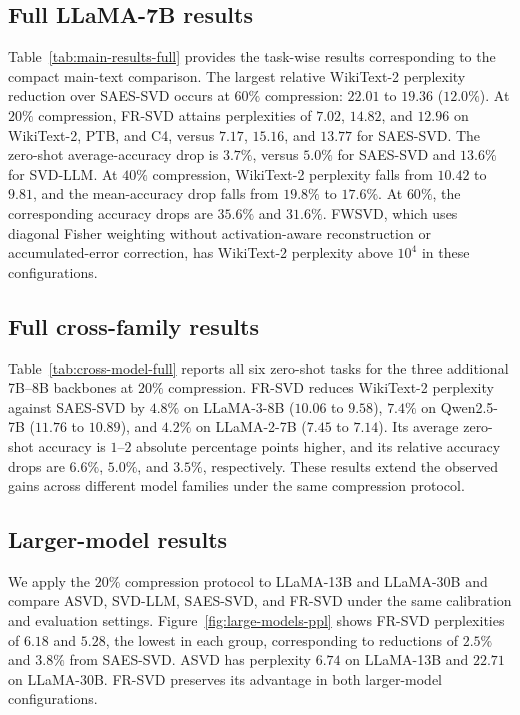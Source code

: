 \subsection{Full LLaMA-7B results}
Table~\ref{tab:main-results-full} provides the task-wise results corresponding to the compact main-text comparison. The largest relative WikiText-2 perplexity reduction over SAES-SVD occurs at $60\%$ compression: $22.01$ to $19.36$ ($12.0\%$). At $20\%$ compression, FR-SVD attains perplexities of $7.02$, $14.82$, and $12.96$ on WikiText-2, PTB, and C4, versus $7.17$, $15.16$, and $13.77$ for SAES-SVD. The zero-shot average-accuracy drop is $3.7\%$, versus $5.0\%$ for SAES-SVD and $13.6\%$ for SVD-LLM. At $40\%$ compression, WikiText-2 perplexity falls from $10.42$ to $9.81$, and the mean-accuracy drop falls from $19.8\%$ to $17.6\%$. At $60\%$, the corresponding accuracy drops are $35.6\%$ and $31.6\%$. FWSVD, which uses diagonal Fisher weighting without activation-aware reconstruction or accumulated-error correction, has WikiText-2 perplexity above $10^4$ in these configurations.



\subsection{Full cross-family results}
Table~\ref{tab:cross-model-full} reports all six zero-shot tasks for the three additional 7B--8B backbones at $20\%$ compression. FR-SVD reduces WikiText-2 perplexity against SAES-SVD by $4.8\%$ on LLaMA-3-8B ($10.06$ to $9.58$), $7.4\%$ on Qwen2.5-7B ($11.76$ to $10.89$), and $4.2\%$ on LLaMA-2-7B ($7.45$ to $7.14$). Its average zero-shot accuracy is $1$--$2$ absolute percentage points higher, and its relative accuracy drops are $6.6\%$, $5.0\%$, and $3.5\%$, respectively. These results extend the observed gains across different model families under the same compression protocol.



\subsection{Larger-model results}\label{app:large-models}
We apply the $20\%$ compression protocol to LLaMA-13B and LLaMA-30B and compare ASVD, SVD-LLM, SAES-SVD, and FR-SVD under the same calibration and evaluation settings. Figure~\ref{fig:large-models-ppl} shows FR-SVD perplexities of $6.18$ and $5.28$, the lowest in each group, corresponding to reductions of $2.5\%$ and $3.8\%$ from SAES-SVD. ASVD has perplexity $6.74$ on LLaMA-13B and $22.71$ on LLaMA-30B. FR-SVD preserves its advantage in both larger-model configurations.

